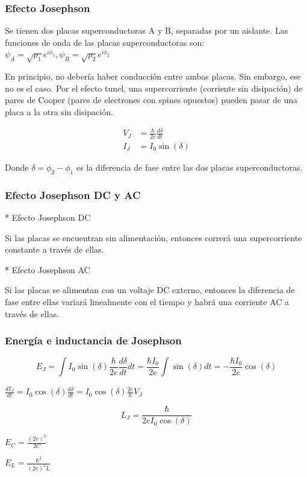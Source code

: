 \documentclass[xetex,mathserif,serif]{beamer}
\begin{document}
\begin{frame}
    \frametitle{Efecto Josephson}

\justify
Se tienen dos placas superconductoras A y B, separadas por un aislante.
Las funciones de onda de las placas superconductoras son:
$\psi_A = \sqrt{\rho_1} e^{i \phi_1}, \psi_B = \sqrt{\rho_2} e^{i \phi_2}$ 

\justify
En principio, no debería haber conducción entre ambas placas.
Sin embargo, ese no es el caso. Por el efecto tunel, una supercorriente (corriente
sin disipación) de pares de Cooper (pares de electrones con spines opuestos)
pueden pasar de una placa a la otra sin disipación.

\begin{align}
    V_J &= \frac{\hbar}{2e} \frac{d\delta}{dt} \\
    I_J &= I_0 \sin(\delta)
\end{align}

\justify
Donde $\delta=\phi_2-\phi_1$ es la diferencia de fase entre las dos placas superconductoras.

\end{frame}

\begin{frame}
    \frametitle{Efecto Josephson DC y AC}

* Efecto Josephson DC

\justify
Si las placas se encuentran sin alimentación, entonces correrá una
supercorriente constante a través de ellas.

* Efecto Josephson AC

\justify
Si las placas se alimentan con un voltaje DC externo, entonces la diferencia
de fase entre ellas variará linealmente con el tiempo y habrá una corriente AC
a través de ellas.

\end{frame}

\begin{frame}
    \frametitle{Energía e inductancia de Josephson}

$$E_J = \int I_0 \sin(\delta) \frac{\hbar}{2e} \frac{d\delta}{dt} dt
 = \frac{\hbar I_0}{2e} \int \sin(\delta) dt
 = - \frac{\hbar I_0}{2e} \cos(\delta)$$

$\frac{dI_J}{dt} = I_0 \cos(\delta) \frac{d \delta}{dt} = I_0 \cos(\delta)
 \frac{2e}{\hbar} V_J$

$$L_J = \frac{\hbar}{2e I_0 \cos(\delta)}$$

$E_C = \frac{(2e)^2}{2C}$

$E_L = \frac{\hbar^2}{(2e)^2L}$

\end{frame}
\end{document}
